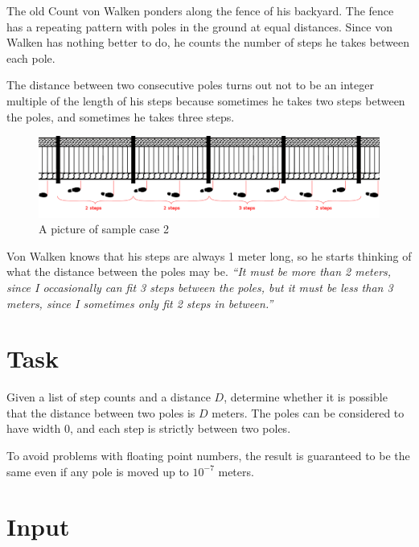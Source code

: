 

\noindent
The old Count von Walken ponders along the fence of his backyard. The fence has a repeating pattern with poles in the ground at equal distances. Since von Walken has nothing better to do, he counts the number of steps he takes between each pole.

The distance between two consecutive poles turns out not to be an integer multiple of the length of his steps because sometimes he takes two steps between the poles, and sometimes he takes three steps.

\begin{figure}[ht]
  \begin{center}
    \includegraphics[width=1\textwidth]{figure}
    \caption{A picture of sample case 2}
  \end{center}
\end{figure}

Von Walken knows that his steps are always 1 meter long, so he starts thinking of what the distance
between the poles may be. \emph{``It must be more than 2 meters, since I occasionally can fit 3
  steps between the poles, but it must be less than 3 meters, since I sometimes only fit 2 steps in between.''}

\section*{Task}
Given a list of step counts and a distance $D$, determine whether it is possible that the distance between two poles is $D$ meters. The poles can be considered to have width $0$, and each step is strictly between two poles.

To avoid problems with floating point numbers, the result is guaranteed to be the same even if any pole is moved up to $10^{-7}$ meters.

\section*{Input}

